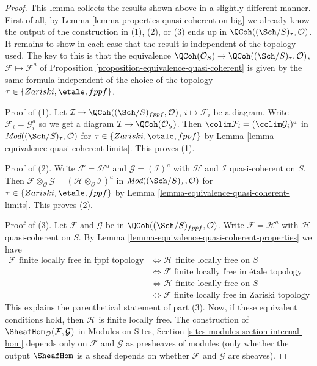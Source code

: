 \begin{proof}
This lemma collects the results shown above in a slightly different manner.
First of all, by Lemma \ref{lemma-properties-quasi-coherent-on-big}
we already know the output of the construction in (1), (2), or (3)
ends up in $\QCoh((\Sch/S)_\tau, \mathcal{O})$.
It remains to show in each case that the result is
independent of the topology used. The key to this is that the equivalence
$\QCoh(\mathcal{O}_S) \to \QCoh((\Sch/S)_\tau, \mathcal{O})$,
$\mathcal{F} \mapsto \mathcal{F}^a$
of Proposition \ref{proposition-equivalence-quasi-coherent}
is given by the same formula independent of the choice
of the topology $\tau \in \{Zariski, \etale, fppf\}$.

\medskip\noindent
Proof of (1). Let $\mathcal{I} \to \QCoh((\Sch/S)_{fppf}, \mathcal{O})$,
$i \mapsto \mathcal{F}_i$ be a diagram. Write
$\mathcal{F}_i = \mathcal{G}_i^a$ so we get a diagram
$\mathcal{I} \to \QCoh(\mathcal{O}_S)$.
Then $\colim \mathcal{F}_i = (\colim \mathcal{G}_i)^a$ in
$\textit{Mod}((\Sch/S)_\tau, \mathcal{O})$ for
$\tau \in \{Zariski, \etale, fppf\}$
by Lemma \ref{lemma-equivalence-quasi-coherent-limits}.
This proves (1).

\medskip\noindent
Proof of (2). Write $\mathcal{F} = \mathcal{H}^a$ and
$\mathcal{G} = (\mathcal{I})^a$ with $\mathcal{H}$ and $\mathcal{I}$
quasi-coherent on $S$. Then
$\mathcal{F} \otimes_\mathcal{O} \mathcal{G} =
(\mathcal{H} \otimes_\mathcal{O} \mathcal{I})^a$ in
$\textit{Mod}((\Sch/S)_\tau, \mathcal{O})$ for
$\tau \in \{Zariski, \etale, fppf\}$
by Lemma \ref{lemma-equivalence-quasi-coherent-limits}.
This proves (2).

\medskip\noindent
Proof of (3). Let $\mathcal{F}$ and $\mathcal{G}$ be in
$\QCoh((\Sch/S)_{fppf}, \mathcal{O})$. Write
$\mathcal{F} = \mathcal{H}^a$ with $\mathcal{H}$
quasi-coherent on $S$. By
Lemma \ref{lemma-equivalence-quasi-coherent-properties} we have
\begin{align*}
\mathcal{F}\text{ finite locally free in fppf topology}
& \Leftrightarrow
\mathcal{H}\text{ finite locally free on }S \\
& \Leftrightarrow
\mathcal{F}\text{ finite locally free in \'etale topology} \\
& \Leftrightarrow
\mathcal{H}\text{ finite locally free on }S \\
& \Leftrightarrow
\mathcal{F}\text{ finite locally free in Zariski topology}
\end{align*}
This explains the parenthetical statement of part (3).
Now, if these equivalent conditions hold, then $\mathcal{H}$
is finite locally free. The construction of
$\SheafHom_\mathcal{O}(\mathcal{F}, \mathcal{G})$ in
Modules on Sites, Section \ref{sites-modules-section-internal-hom}
depends only on $\mathcal{F}$ and $\mathcal{G}$ as presheaves
of modules (only whether the output $\SheafHom$ is
a sheaf depends on whether $\mathcal{F}$ and $\mathcal{G}$ are
sheaves).
\end{proof}










